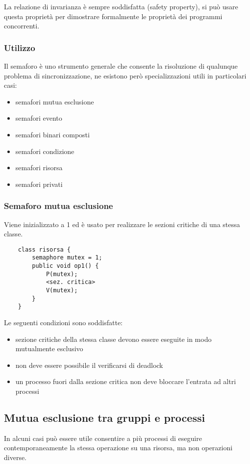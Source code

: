 La relazione di invarianza è sempre soddisfatta (safety property), si può usare questa proprietà per dimostrare formalmente le proprietà dei programmi concorrenti.

\subsubsection{Utilizzo}
Il semaforo è uno strumento generale che consente la risoluzione di qualunque problema di sincronizzazione, ne esistono però specializzazioni utili in particolari casi:
\begin{itemize}
    \item semafori mutua esclusione
    \item semafori evento
    \item semafori binari composti
    \item semafori condizione
    \item semafori risorsa
    \item semafori privati
\end{itemize}

\subsubsection{Semaforo mutua esclusione}

Viene inizializzato a 1 ed è usato per realizzare le sezioni critiche di una stessa classe.
\begin{lstlisting}
    class risorsa {
        semaphore mutex = 1;
        public void op1() {
            P(mutex);
            <sez. critica>
            V(mutex);
        }
    }
\end{lstlisting}

Le seguenti condizioni sono soddisfatte:
\begin{itemize}
    \item sezione critiche della stessa classe devono essere eseguite in modo mutualmente esclusivo
    \item non deve essere possibile il verificarsi di deadlock
    \item un processo fuori dalla sezione critica non deve bloccare l'entrata ad altri processi
\end{itemize}

\subsection{Mutua esclusione tra gruppi e processi}
In alcuni casi può essere utile consentire a più processi di eseguire contemporaneamente la stessa operazione su una risorsa, ma non operazioni diverse.

